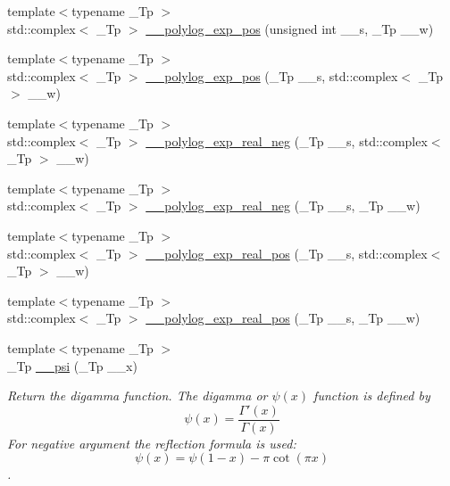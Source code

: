 \begin{DoxyCompactItemize}
{\footnotesize template$<$typename \+\_\+\+Tp $>$ }\\std\+::complex$<$ \+\_\+\+Tp $>$ \hyperlink{namespacestd_1_1____detail_ab13a4be6685dd222b654da3297342d7e}{\+\_\+\+\_\+polylog\+\_\+exp\+\_\+pos} (unsigned int \+\_\+\+\_\+s, \+\_\+\+Tp \+\_\+\+\_\+w)
\item 
{\footnotesize template$<$typename \+\_\+\+Tp $>$ }\\std\+::complex$<$ \+\_\+\+Tp $>$ \hyperlink{namespacestd_1_1____detail_a56b0f5bc6f4955469fd5f83105cbd466}{\+\_\+\+\_\+polylog\+\_\+exp\+\_\+pos} (\+\_\+\+Tp \+\_\+\+\_\+s, std\+::complex$<$ \+\_\+\+Tp $>$ \+\_\+\+\_\+w)
\item 
{\footnotesize template$<$typename \+\_\+\+Tp $>$ }\\std\+::complex$<$ \+\_\+\+Tp $>$ \hyperlink{namespacestd_1_1____detail_abe2e38af779623f338c77dc46ac673bd}{\+\_\+\+\_\+polylog\+\_\+exp\+\_\+real\+\_\+neg} (\+\_\+\+Tp \+\_\+\+\_\+s, std\+::complex$<$ \+\_\+\+Tp $>$ \+\_\+\+\_\+w)
\item 
{\footnotesize template$<$typename \+\_\+\+Tp $>$ }\\std\+::complex$<$ \+\_\+\+Tp $>$ \hyperlink{namespacestd_1_1____detail_ac9ae4e4771187bac37c1ccc83719feb2}{\+\_\+\+\_\+polylog\+\_\+exp\+\_\+real\+\_\+neg} (\+\_\+\+Tp \+\_\+\+\_\+s, \+\_\+\+Tp \+\_\+\+\_\+w)
\item 
{\footnotesize template$<$typename \+\_\+\+Tp $>$ }\\std\+::complex$<$ \+\_\+\+Tp $>$ \hyperlink{namespacestd_1_1____detail_ab27023a3d94393d41c994000b2c16684}{\+\_\+\+\_\+polylog\+\_\+exp\+\_\+real\+\_\+pos} (\+\_\+\+Tp \+\_\+\+\_\+s, std\+::complex$<$ \+\_\+\+Tp $>$ \+\_\+\+\_\+w)
\item 
{\footnotesize template$<$typename \+\_\+\+Tp $>$ }\\std\+::complex$<$ \+\_\+\+Tp $>$ \hyperlink{namespacestd_1_1____detail_ad77bb9953443dfb1575a61a4573c6913}{\+\_\+\+\_\+polylog\+\_\+exp\+\_\+real\+\_\+pos} (\+\_\+\+Tp \+\_\+\+\_\+s, \+\_\+\+Tp \+\_\+\+\_\+w)
\item 
{\footnotesize template$<$typename \+\_\+\+Tp $>$ }\\\+\_\+\+Tp \hyperlink{namespacestd_1_1____detail_ad7246a3ca90be800e6cc79c8e2360abd}{\+\_\+\+\_\+psi} (\+\_\+\+Tp \+\_\+\+\_\+x)
\begin{DoxyCompactList}\small\item\em Return the digamma function. The digamma or $ \psi(x) $ function is defined by \[ \psi(x) = \frac{\Gamma'(x)}{\Gamma(x)} \] For negative argument the reflection formula is used\+: \[ \psi(x) = \psi(1-x) - \pi \cot(\pi x) \]. \end{DoxyCompactList}\item 

\end{DoxyCompactItemize}
